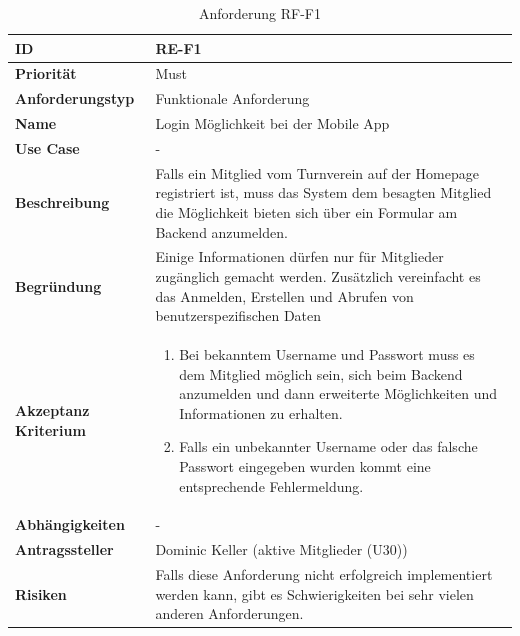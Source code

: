 \begin{table}[ht]
\centering
  \begin{tabular}{ l | p{8cm} }
	\hline
	\rowcolor{gray}
	\textbf{ID} 			&	\textbf{RE-F1}\\ \hline
	\textbf{Priorität} 		&	Must\\ \hline
	\textbf{Anforderungstyp}	&	Funktionale Anforderung\\ \hline
	\textbf{Name} 			&	Login Möglichkeit bei der Mobile App\\ \hline
	\textbf{Use Case} 		&	-\\ \hline
	\textbf{Beschreibung} 	&	Falls ein Mitglied vom Turnverein auf der Homepage registriert ist, muss das System dem besagten Mitglied die Möglichkeit bieten sich über ein Formular am Backend anzumelden.\\ \hline
	\textbf{Begründung} 		&	Einige Informationen dürfen nur für Mitglieder zugänglich
					gemacht werden. Zusätzlich vereinfacht es das Anmelden, Erstellen
					und Abrufen von benutzerspezifischen Daten\\ \hline
	\textbf{Akzeptanz Kriterium}	&	\begin{enumerate}
					\item Bei bekanntem Username und Passwort muss es dem Mitglied möglich sein, sich beim Backend anzumelden und dann erweiterte	Möglichkeiten und Informationen zu erhalten.
					\item Falls ein unbekannter Username oder das falsche Passwort eingegeben wurden kommt eine entsprechende Fehlermeldung.
					\end{enumerate}
					\\ \hline
	\textbf{Abhängigkeiten} 	&	-\\ \hline
	\textbf{Antragssteller} 	&	Dominic Keller (aktive Mitglieder (U30))\\ \hline
	\textbf{Risiken}	 	&	Falls diese Anforderung nicht erfolgreich implementiert werden kann, gibt es Schwierigkeiten bei sehr vielen anderen Anforderungen.
  \end{tabular}
   \caption{Anforderung RF-F1}\label{table:req_1}
\end{table}

